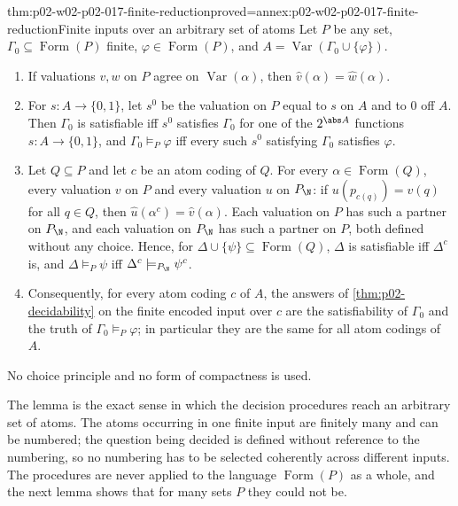 \begin{hblemma}{thm:p02-w02-p02-017-finite-reduction}{proved=annex:p02-w02-p02-017-finite-reduction}{Finite inputs over an arbitrary set of atoms}
Let \(P\) be any set, \(\Gamma_0\subseteq\operatorname{Form}(P)\)
finite, \(\varphi\in\operatorname{Form}(P)\), and
\(A=\operatorname{Var}(\Gamma_0\cup\{\varphi\})\).
\begin{enumerate}
 \item If valuations \(v,w\) on \(P\) agree on
       \(\operatorname{Var}(\alpha)\), then
       \(\widehat v(\alpha)=\widehat w(\alpha)\).
 \item For \(s:A\to\{0,1\}\), let \(s^{0}\) be the valuation on \(P\)
       equal to \(s\) on \(A\) and to \(0\) off \(A\).  Then
       \(\Gamma_0\) is satisfiable iff \(s^{0}\) satisfies \(\Gamma_0\)
       for one of the \(2^{\abs A}\) functions \(s:A\to\{0,1\}\), and
       \(\Gamma_0\models_P\varphi\) iff every such \(s^{0}\) satisfying
       \(\Gamma_0\) satisfies \(\varphi\).
 \item Let \(Q\subseteq P\) and let \(c\) be an atom coding of \(Q\).
       For every \(\alpha\in\operatorname{Form}(Q)\), every valuation
       \(v\) on \(P\) and every valuation \(u\) on \(P_{\N}\): if
       \(u(p_{c(q)})=v(q)\) for all \(q\in Q\), then
       \(\widehat u(\alpha^{c})=\widehat v(\alpha)\).  Each valuation on
       \(P\) has such a partner on \(P_{\N}\), and each valuation on
       \(P_{\N}\) has such a partner on \(P\), both defined without any
       choice.  Hence, for
       \(\Delta\cup\{\psi\}\subseteq\operatorname{Form}(Q)\),
       \(\Delta\) is satisfiable iff \(\Delta^{c}\) is, and
       \(\Delta\models_P\psi\) iff \(\Delta^{c}\models_{P_{\N}}\psi^{c}\).
 \item Consequently, for every atom coding \(c\) of \(A\), the answers
       of \cref{thm:p02-decidability} on the finite encoded input over
       \(c\) are the satisfiability of \(\Gamma_0\) and the truth of
       \(\Gamma_0\models_P\varphi\); in particular they are the same for
       all atom codings of \(A\).
\end{enumerate}
No choice principle and no form of compactness is used.
\end{hblemma}

The lemma is the exact sense in which the decision procedures reach an
arbitrary set of atoms.  The atoms occurring in one finite input are
finitely many and can be numbered; the question being decided is
defined without reference to the numbering, so no numbering has to be
selected coherently across different inputs.  The procedures are never
applied to the language \(\operatorname{Form}(P)\) as a whole, and the
next lemma shows that for many sets \(P\) they could not be.

